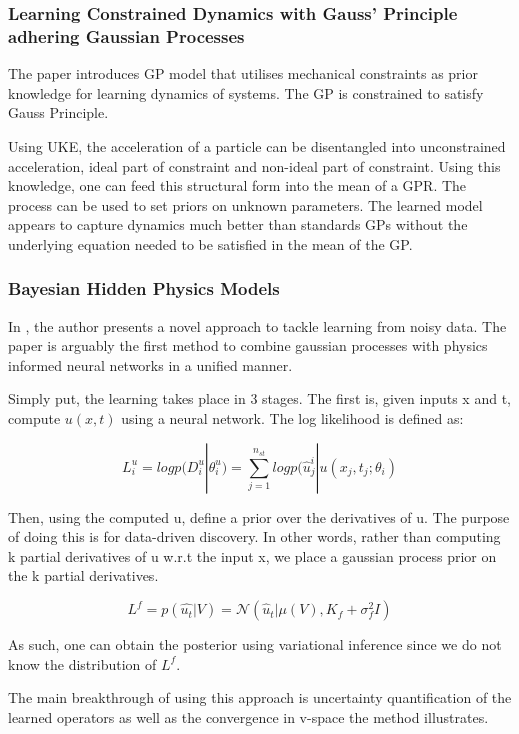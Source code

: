 \documentclass{article}
\begin{document}
\subsubsection{Learning Constrained Dynamics with Gauss' Principle adhering Gaussian Processes}

The paper \cite{geist_learning_2020} introduces GP model that utilises mechanical constraints as prior knowledge for learning dynamics of systems. The GP is constrained to satisfy Gauss Principle. 

Using UKE, the acceleration of a particle can be disentangled into unconstrained acceleration, ideal part of constraint and non-ideal part of constraint.  Using this knowledge, one can feed this structural form into the mean of a GPR. The process can be used to set priors on unknown parameters. The learned model appears to capture dynamics much better than standards GPs without the underlying equation needed to be satisfied in the mean of the GP.

\subsubsection{Bayesian Hidden Physics Models}

In \cite{atkinson_bayesian_2020}, the author presents a novel approach to tackle learning from noisy data. The paper is arguably the first method to combine gaussian processes with physics informed neural networks in a unified manner.

Simply put, the learning takes place in 3 stages. The first is, given inputs x and t, compute $u(x,t)$ using a neural network. The log likelihood is defined as:

$$ L_i^u = log p(D_i^u|\theta_i^u) = \sum_{j=1}^{n_{st}} log p(\hat{u}_j^{i} | u(x_j,t_j;\theta_i) $$

Then, using the computed u, define a prior over the derivatives of u. The purpose of doing this is for data-driven discovery. In other words, rather than computing k partial derivatives of u w.r.t the input x, we place a gaussian process prior on the k partial derivatives. 

$$ L^f = p(\hat{u_t}|V) = \mathcal{N} (\hat{u}_t|\mu(V),K_f +\sigma_f^2 I) $$

As such, one can obtain the posterior using variational inference since we do not know the distribution of $L^f$.

The main breakthrough of using this approach is uncertainty quantification of the learned operators as well as the convergence in v-space the method illustrates. 
\end{document}
